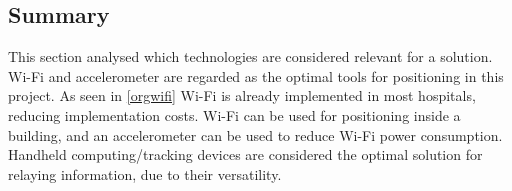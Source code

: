 









\subsection{Summary}
This section analysed which technologies are considered relevant for a solution. Wi-Fi and accelerometer are regarded as the optimal tools for positioning in this project. As seen in \cref{orgwifi} Wi-Fi is already implemented in most hospitals, reducing implementation costs. Wi-Fi can be used for positioning inside a building, and an accelerometer can be used to reduce Wi-Fi power consumption. Handheld computing/tracking devices are considered the optimal solution for relaying information, due to their versatility.
%